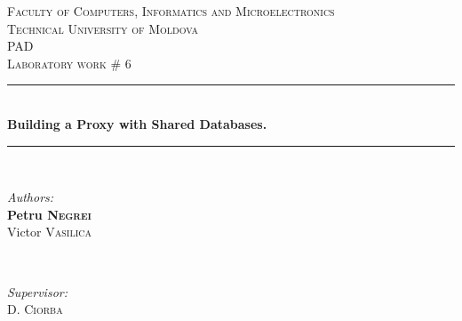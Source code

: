 \documentclass[12pt]{article}
\begin{document}
  \begin{titlepage}

 \newcommand{\HRule}{\rule{\linewidth}{0.5mm}} %
  \begin{center} %

  \textsc{\large Faculty of Computers, Informatics and Microelectronics}\\[0.5cm]
  \textsc{\large Technical University of Moldova}\\[1.2cm] %
  \vspace{35 mm}
  \textsc{\Large PAD}\\[0.5cm] %
  \textsc{\large Laboratory work \# 6}\\[0.5cm] %

  \vspace{10 mm}
  \HRule \\[0.4cm]
  { \large \bfseries  Building a Proxy with Shared Databases.}\\[0.4cm] %
  \HRule \\[1.5cm]

      \vspace{25mm}

      \begin{minipage}{0.4\textwidth}
      \begin{flushleft} \large
      \emph{Authors:}\\
      \textbf{Petru \textsc{Negrei}} \\
      Victor \textsc{Vasilica}
      \end{flushleft}
      \end{minipage}
      ~
      \begin{minipage}{0.4\textwidth}
      \begin{flushright} \large
      \emph{Supervisor:} \\
      D. \textsc{Ciorba} %
      \end{flushright}
      \end{minipage}\\[4cm]


\end{center}
\end{titlepage}
\end{document}
